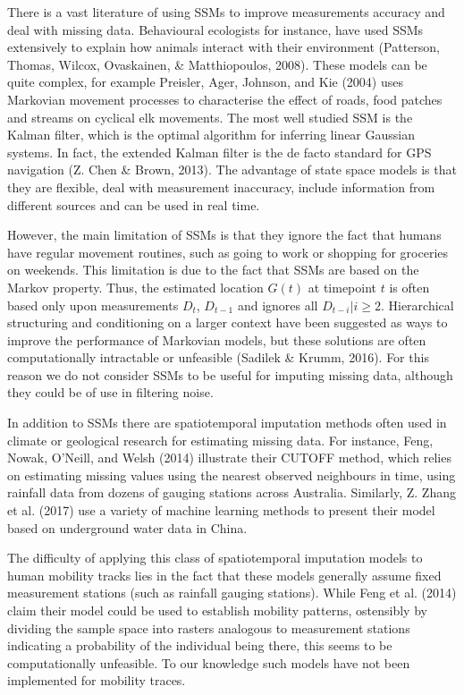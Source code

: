 \documentclass[english,man]{apa6}
\theoremstyle{definition}
\theoremstyle{definition}
\theoremstyle{definition}
\theoremstyle{remark}
\begin{document}
There is a vast literature of using SSMs to improve measurements
accuracy and deal with missing data. Behavioural ecologists for
instance, have used SSMs extensively to explain how animals interact
with their environment (Patterson, Thomas, Wilcox, Ovaskainen, \&
Matthiopoulos, 2008). These models can be quite complex, for example
Preisler, Ager, Johnson, and Kie (2004) uses Markovian movement
processes to characterise the effect of roads, food patches and streams
on cyclical elk movements. The most well studied SSM is the Kalman
filter, which is the optimal algorithm for inferring linear Gaussian
systems. In fact, the extended Kalman filter is the de facto standard
for GPS navigation (Z. Chen \& Brown, 2013). The advantage of state
space models is that they are flexible, deal with measurement
inaccuracy, include information from different sources and can be used
in real time.

However, the main limitation of SSMs is that they ignore the fact that
humans have regular movement routines, such as going to work or shopping
for groceries on weekends. This limitation is due to the fact that SSMs
are based on the Markov property. Thus, the estimated location \(G(t)\)
at timepoint \(t\) is often based only upon measurements \(D_t\),
\(D_{t-1}\) and ignores all \(D_{t-i}|i\geq2\). Hierarchical structuring
and conditioning on a larger context have been suggested as ways to
improve the performance of Markovian models, but these solutions are
often computationally intractable or unfeasible (Sadilek \& Krumm,
2016). For this reason we do not consider SSMs to be useful for imputing
missing data, although they could be of use in filtering noise.

In addition to SSMs there are spatiotemporal imputation methods often
used in climate or geological research for estimating missing data. For
instance, Feng, Nowak, O'Neill, and Welsh (2014) illustrate their CUTOFF
method, which relies on estimating missing values using the nearest
observed neighbours in time, using rainfall data from dozens of gauging
stations across Australia. Similarly, Z. Zhang et al. (2017) use a
variety of machine learning methods to present their model based on
underground water data in China.

The difficulty of applying this class of spatiotemporal imputation
models to human mobility tracks lies in the fact that these models
generally assume fixed measurement stations (such as rainfall gauging
stations). While Feng et al. (2014) claim their model could be used to
establish mobility patterns, ostensibly by dividing the sample space
into rasters analogous to measurement stations indicating a probability
of the individual being there, this seems to be computationally
unfeasible. To our knowledge such models have not been implemented for
mobility traces.
\end{document}
